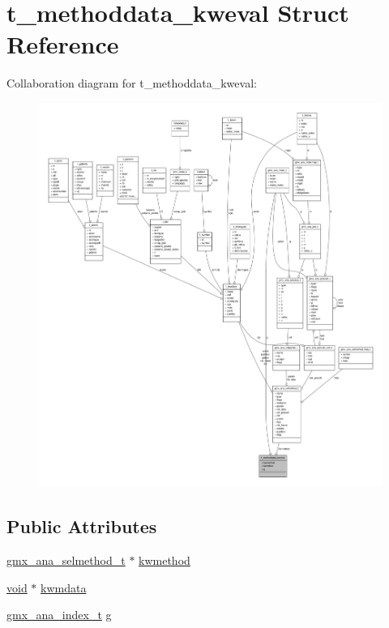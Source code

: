 \hypertarget{structt__methoddata__kweval}{\section{t\-\_\-methoddata\-\_\-kweval \-Struct \-Reference}
\label{structt__methoddata__kweval}
}


\-Collaboration diagram for t\-\_\-methoddata\-\_\-kweval\-:
\nopagebreak
\begin{figure}[H]
\begin{center}
\leavevmode
\includegraphics[width=350pt]{structt__methoddata__kweval__coll__graph}
\end{center}
\end{figure}
\subsection*{\-Public \-Attributes}
\begin{DoxyCompactItemize}
\item 
\hyperlink{structgmx__ana__selmethod__t}{gmx\-\_\-ana\-\_\-selmethod\-\_\-t} $\ast$ \hyperlink{structt__methoddata__kweval_a4f08ad0c6088affebdfd5cb0badb2cce}{kwmethod}
\item 
\hyperlink{nbnxn__kernel__simd__4xn__outer_8h_a8dc3f4a797ed992dff49d2fa3477eee8}{void} $\ast$ \hyperlink{structt__methoddata__kweval_a6fe52d6fadf8fe74e5938ca53512dafd}{kwmdata}
\item 
\hyperlink{structgmx__ana__index__t}{gmx\-\_\-ana\-\_\-index\-\_\-t} \hyperlink{structt__methoddata__kweval_a338ffa357616c7e611b0002cc98a8a50}{g}
\end{DoxyCompactItemize}


